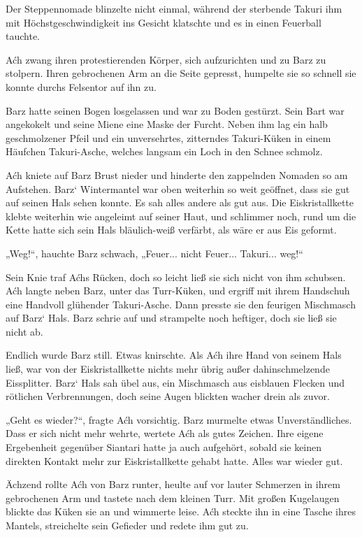 Der Steppennomade blinzelte nicht einmal, während der sterbende Takuri ihm mit Höchstgeschwindigkeit ins Gesicht klatschte und es in einen Feuerball tauchte.

Aćh zwang ihren protestierenden Körper, sich aufzurichten und zu Barz zu stolpern. Ihren gebrochenen Arm an die Seite gepresst, humpelte sie so schnell sie konnte durchs Felsentor auf ihn zu.

Barz hatte seinen Bogen losgelassen und war zu Boden gestürzt. Sein Bart war angekokelt und seine Miene eine Maske der Furcht. Neben ihm lag ein halb geschmolzener Pfeil und ein unversehrtes, zitterndes Takuri-Küken in einem Häufchen Takuri-Asche, welches langsam ein Loch in den Schnee schmolz.

Aćh kniete auf Barz Brust nieder und hinderte den zappelnden Nomaden so am Aufstehen. Barz‘ Wintermantel war oben weiterhin so weit geöffnet, dass sie gut auf seinen Hals sehen konnte. Es sah alles andere als gut aus. Die Eiskristallkette klebte weiterhin wie angeleimt auf seiner Haut, und schlimmer noch, rund um die Kette hatte sich sein Hals bläulich-weiß verfärbt, als wäre er aus Eis geformt.

„Weg!“, hauchte Barz schwach, „Feuer... nicht Feuer... Takuri... weg!“

Sein Knie traf Aćhs Rücken, doch so leicht ließ sie sich nicht von ihm schubsen. Aćh langte neben Barz, unter das Turr-Küken, und ergriff mit ihrem Handschuh eine Handvoll glühender Takuri-Asche. Dann presste sie den feurigen Mischmasch auf Barz‘ Hals. Barz schrie auf und strampelte noch heftiger, doch sie ließ sie nicht ab.

Endlich wurde Barz still. Etwas knirschte. Als Aćh ihre Hand von seinem Hals ließ, war von der Eiskristallkette nichts mehr übrig außer dahinschmelzende Eissplitter. Barz‘ Hals sah übel aus, ein Mischmasch aus eisblauen Flecken und rötlichen Verbrennungen, doch seine Augen blickten wacher drein als zuvor.

„Geht es wieder?“, fragte Aćh vorsichtig. Barz murmelte etwas Unverständliches. Dass er sich nicht mehr wehrte, wertete Aćh als gutes Zeichen. Ihre eigene Ergebenheit gegenüber Siantari hatte ja auch aufgehört, sobald sie keinen direkten Kontakt mehr zur Eiskristallkette gehabt hatte. Alles war wieder gut.

Ächzend rollte Aćh von Barz runter, heulte auf vor lauter Schmerzen in ihrem gebrochenen Arm und tastete nach dem kleinen Turr. Mit großen Kugelaugen blickte das Küken sie an und wimmerte leise. Aćh steckte ihn in eine Tasche ihres Mantels, streichelte sein Gefieder und redete ihm gut zu.


